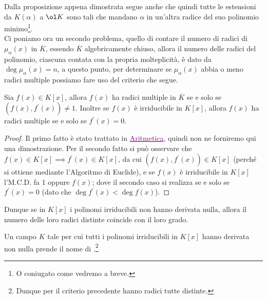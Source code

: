 \documentclass[11pt]{scrartcl}
\begin{document}
Dalla proposizione appena dimostrata segue anche che quindi tutte le estensioni da $K(\alpha)$ a $\ol K$ sono tali che mandano $\alpha$ in un'altra radice del suo polinomio minimo\footnote{O coniugato come vedremo a breve.}.\\
Ci poniamo ora un secondo problema, quello di contare il numero di radici di $\mu_\alpha (x)$ in $\overline K$, essendo $\overline K$ algebricamente chiuso, allora il numero delle radici del polinomio, ciascuna contata 
con la propria molteplicità, è dato da $\deg \mu_\alpha(x) = n$, a questo punto, per determinare se $\mu_\alpha(x)$ abbia o meno radici multiple possiamo fare uso del criterio che segue.

\begin{theorem}
	\label{derivata}
	Sia $f(x) \in K[x]$, allora $f(x)$ ha radici multiple in $\overline K$ se e solo se $(f(x),f^{\prime}(x)) \ne 1$. Inoltre se $f(x)$ è irriducibile in $K[x]$, allora $f(x)$ ha radici multiple se e solo se $f^{\prime}(x) = 0$.
\end{theorem}

\begin{proof}
    Il primo fatto è stato trattato in \href{https://github.com/diego-unipi/Appunti-Aritmetica}{\textcolor{purple}{Aritmetica}}, quindi non ne forniremo qui una dimostrazione. Per il secondo fatto si può osservare che $f(x) \in K[x] \implies f^{\prime}(x) \in K[x]$,
    da cui $(f(x),f^{\prime}(x)) \in K[x]$ (perché si ottiene mediante l'Algoritmo di Euclide), e se $f(x)$ è irriducibile in $K[x]$ l'M.C.D. fa 1 oppure $f(x)$; dove il secondo caso si realizza se e solo se $f^{\prime}(x) = 0$ (dato che $\deg f^{\prime}(x) < \deg f(x)$).
\end{proof}

Dunque se in $K[x]$ i polinomi irriducibili non hanno derivata nulla, allora il numero delle loro radici distinte coincide con il loro grado.

\begin{definition}
    Un campo $K$ tale per cui tutti i polinomi irriducibili in $K[x]$ hanno derivata non nulla prende il nome di .\footnote{Dunque per il criterio precedente hanno radici tutte distinte.}
\end{definition}
\end{document}
